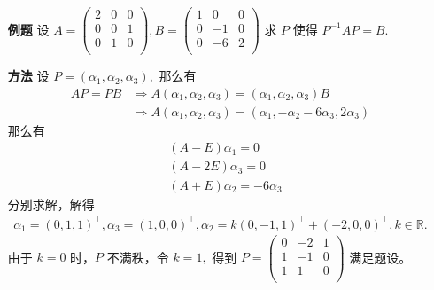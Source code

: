 \begin{enumerate}
    \item[\textbf{例题}] 设 $ A = \begin{pmatrix}
        2&0&0\\0&0&1\\0&1&0\\
    \end{pmatrix}, B=\begin{pmatrix}
        1&0&0\\0&-1&0\\0&-6&2\\
    \end{pmatrix} $ 
    求 $ P $ 使得 $ P^{-1}AP = B. $ 
    \item[\textbf{方法}]
    设 $ P = (\alpha_1,\alpha_2,\alpha_3), $ 那么有
    \begin{equation*}
        \begin{aligned}
            AP = PB &\Rightarrow
            A(\alpha_1,\alpha_2,\alpha_3) = (\alpha_1,\alpha_2,\alpha_3)B \\ 
            &\Rightarrow 
            A(\alpha_1,\alpha_2,\alpha_3) = (\alpha_1,-\alpha_2-6\alpha_3,2\alpha_3)
        \end{aligned}
    \end{equation*}
    那么有
    \begin{equation*}
        \begin{aligned}
            &(A-E)\alpha_1 = 0\\
            &(A-2E)\alpha_3 = 0\\ 
            &(A+E)\alpha_2 = -6\alpha_3
        \end{aligned}
    \end{equation*}
    分别求解，解得
    \begin{equation*}
        \begin{aligned}
            \alpha_1 = (0,1,1)^\top, \alpha_3 = (1,0,0)^\top,
            \alpha_2 = k(0,-1,1)^\top+(-2,0,0)^\top, k\in \mathbb{R}.
        \end{aligned}
    \end{equation*}
    由于 $ k = 0 $ 时，$ P $ 不满秩，令 $ k = 1, $ 得到
    $ P = \begin{pmatrix}
        0&-2&1\\1&-1&0\\1&1&0\\
    \end{pmatrix} $ 满足题设。
\end{enumerate}

